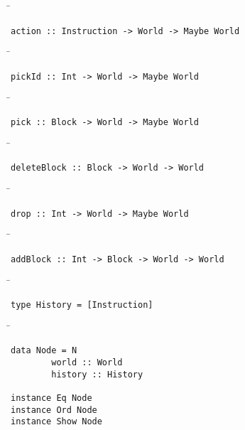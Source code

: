 \begin{tabbing}
\hspace*{1cm}\= \kill
\> 
\end{tabbing}
\begin{verbatim}
action :: Instruction -> World -> Maybe World
\end{verbatim}
\begin{tabbing}
\hspace*{1cm}\= \kill
\> 
\end{tabbing}
\begin{verbatim}
pickId :: Int -> World -> Maybe World
\end{verbatim}
\begin{tabbing}
\hspace*{1cm}\= \kill
\> 
\end{tabbing}
\begin{verbatim}
pick :: Block -> World -> Maybe World
\end{verbatim}
\begin{tabbing}
\hspace*{1cm}\= \kill
\> 
\end{tabbing}
\begin{verbatim}
deleteBlock :: Block -> World -> World
\end{verbatim}
\begin{tabbing}
\hspace*{1cm}\= \kill
\> 
\end{tabbing}
\begin{verbatim}
drop :: Int -> World -> Maybe World
\end{verbatim}
\begin{tabbing}
\hspace*{1cm}\= \kill
\> 
\end{tabbing}
\begin{verbatim}
addBlock :: Int -> Block -> World -> World
\end{verbatim}
\begin{tabbing}
\hspace*{1cm}\= \kill
\> 
\end{tabbing}
\begin{verbatim}
type History = [Instruction]
\end{verbatim}
\begin{tabbing}
\hspace*{1cm}\= \kill
\> 
\end{tabbing}
\begin{verbatim}
data Node = N
        world :: World
        history :: History

instance Eq Node
instance Ord Node
instance Show Node
\end{verbatim}
